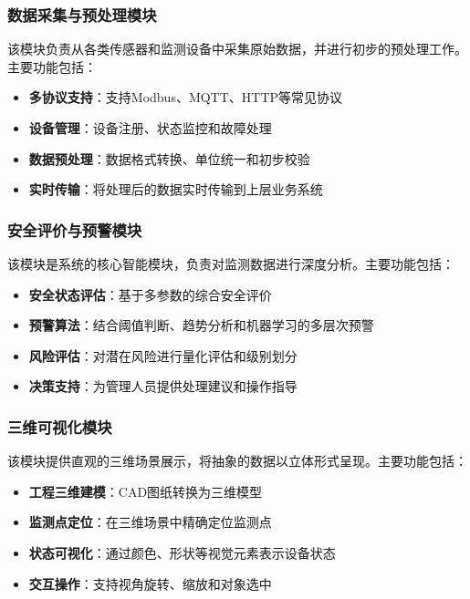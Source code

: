 \subsubsection{数据采集与预处理模块}\label{ux6570ux636eux91c7ux96c6ux4e0eux9884ux5904ux7406ux6a21ux5757}
该模块负责从各类传感器和监测设备中采集原始数据，并进行初步的预处理工作。主要功能包括： \begin{itemize} \tightlist \item \textbf{多协议支持}：支持Modbus、MQTT、HTTP等常见协议
\item \textbf{设备管理}：设备注册、状态监控和故障处理 \item \textbf{数据预处理}：数据格式转换、单位统一和初步校验 \item \textbf{实时传输}：将处理后的数据实时传输到上层业务系统
\end{itemize} \subsubsection{安全评价与预警模块}\label{ux5b89ux5168ux8bc4ux4ef7ux4e0eux9884ux8b66ux6a21ux5757}
该模块是系统的核心智能模块，负责对监测数据进行深度分析。主要功能包括： \begin{itemize} \tightlist \item \textbf{安全状态评估}：基于多参数的综合安全评价 \item
\textbf{预警算法}：结合阈值判断、趋势分析和机器学习的多层次预警 \item \textbf{风险评估}：对潜在风险进行量化评估和级别划分 \item \textbf{决策支持}：为管理人员提供处理建议和操作指导
\end{itemize} \subsubsection{三维可视化模块}\label{ux4e09ux7ef4ux53efux89c6ux5316ux6a21ux5757}
该模块提供直观的三维场景展示，将抽象的数据以立体形式呈现。主要功能包括： \begin{itemize} \tightlist \item \textbf{工程三维建模}：CAD图纸转换为三维模型 \item
\textbf{监测点定位}：在三维场景中精确定位监测点 \item \textbf{状态可视化}：通过颜色、形状等视觉元素表示设备状态 \item \textbf{交互操作}：支持视角旋转、缩放和对象选中 \end{itemize}

